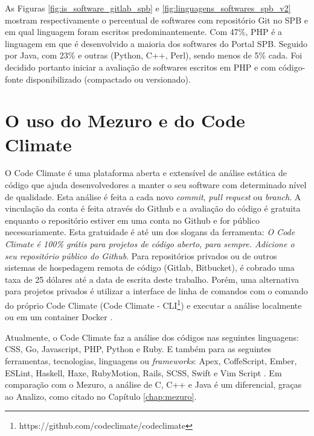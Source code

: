 \newpage

As Figuras \ref{fig:is_software_gitlab_spb} e \ref{fig:linguagens_softwares_spb_v2}
mostram respectivamente o percentual de softwares com repositório Git no SPB e
em qual linguagem foram escritos predominantemente. Com 47\%, PHP é a linguagem
em que é desenvolvido a maioria dos softwares do Portal SPB. Seguido por Java,
com 23\% e outras (Python, C++, Perl), sendo menos de 5\% cada. Foi decidido
portanto iniciar a avaliação de softwares escritos em PHP e com código-fonte
disponibilizado (compactado ou versionado).

\newpage

\section{O uso do Mezuro e do Code Climate}

O Code Climate é uma plataforma aberta e extensível de análise estática de código
que ajuda desenvolvedores a manter o seu software com determinado nível de
qualidade. Esta análise é feita a cada novo \textit{commit},
\textit{pull request} ou \textit{branch}. A vinculação da conta é feita através
do Github e a avaliação do código é gratuita enquanto o repositório estiver em
uma conta no Github e for público necessariamente. Esta gratuidade é até um dos
slogans da ferramenta: \textit{O Code Climate é 100\% grátis para
projetos de código aberto, para sempre. Adicione o seu repositório público do
Github}. Para repositórios privados ou de outros sistemas de hospedagem remota de
código (Gitlab, Bitbucket), é cobrado uma taxa de 25 dólares até a data de
escrita deste trabalho. Porém, uma alternativa para projetos privados é utilizar
a interface de linha de comandos com o comando do próprio Code Climate (Code
Climate - CLI\footnote{https://github.com/codeclimate/codeclimate}) e executar a
análise localmente ou em um container Docker \cite{codeClimateDoc}.

Atualmente, o Code Climate faz a análise dos códigos nas seguintes linguagens:
CSS, Go, Javascript, PHP, Python e Ruby. E também para as seguintes ferramentas,
tecnologias, linguagens ou \textit{frameworks}: Apex, CoffeScript, Ember, ESLint,
Haskell, Haxe, RubyMotion, Rails, SCSS, Swift e Vim Script \cite{codeClimateDoc}.
Em comparação com o Mezuro, a análise de C, C++ e Java é um diferencial, graças
ao Analizo, como citado no Capítulo \ref{chap:mezuro}.

